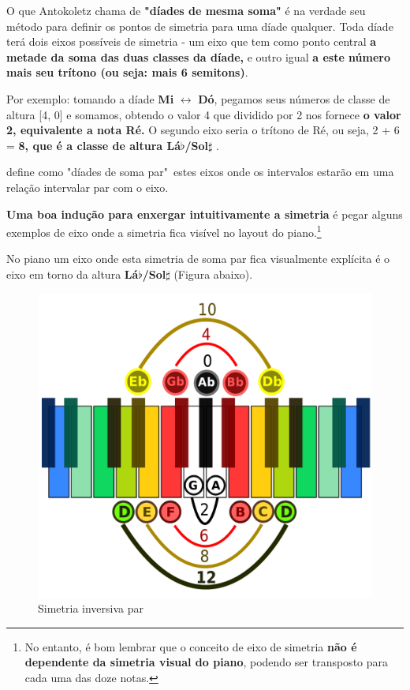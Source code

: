 \documentclass[
	12pt,				%
	openright,			%
	twoside,			%
	a4paper,			%
	english,			%
	french,				%
	spanish,			%
	brazil				%
	]{abntex2}
\begin{document}
O que Antokoletz chama de \textbf{"díades de mesma soma"} é na verdade seu método para definir os pontos de simetria para uma díade qualquer. Toda díade terá dois eixos possíveis de simetria - um eixo que tem como ponto central \textbf{a metade da soma das duas classes da díade,} e outro igual \textbf{a este número mais seu trítono (ou seja: mais 6 semitons)}. 

Por exemplo: tomando a díade \textbf{Mi} $\leftrightarrow $ \textbf{Dó}, pegamos seus números de classe de altura [4, 0] e somamos, obtendo o valor 4 que dividido por 2 nos fornece \textbf{o valor 2, equivalente a nota Ré.} O segundo eixo seria o trítono de Ré, ou seja, 2 + 6 =\textbf{ 8, que é a classe de altura Lá$\flat$/Sol$\sharp$ }. 


 define como "díades de soma par"\ estes eixos onde os intervalos estarão em uma relação intervalar par com o eixo.

\textbf{Uma boa indução para enxergar intuitivamente a simetria} é pegar alguns exemplos de eixo onde a simetria fica visível no layout do piano.\footnote{No entanto, é bom lembrar que o conceito de eixo de simetria \textbf{não é dependente  da simetria visual do piano}, podendo ser transposto para cada uma das doze notas.}

No piano um eixo onde esta simetria de soma par fica visualmente explícita é o eixo em torno da altura \textbf{Lá$\flat$/Sol$\sharp$} (Figura abaixo).

\begin{figure}[!h]
	\caption{\label{fig_grafico}Simetria inversiva par}
	\begin{center}
	    \includegraphics[scale=0.3]{axis/simetriainversiva_par.pdf}
	\end{center}
\end{figure}
\end{document}
